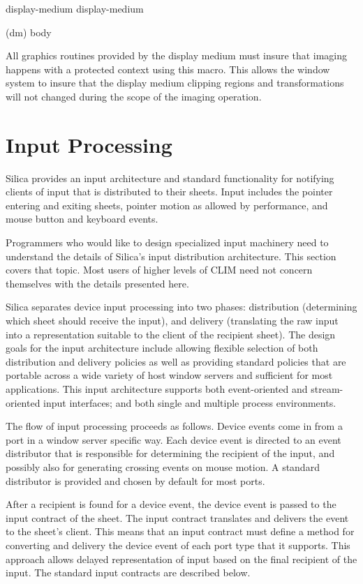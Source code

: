 { {display-medium} 
 {display-medium}

 {(dm) \body body}

All graphics routines provided by the display medium must insure that imaging
happens with a protected context using this macro.  This allows the window
system to insure that the display medium clipping regions and transformations
will not changed during the scope of the imaging operation.

\chapter {Input Processing}

Silica provides an input architecture and standard functionality for notifying
clients of input that is distributed to their sheets.  Input includes the
pointer entering and exiting sheets, pointer motion as allowed by performance,
and mouse button and keyboard events.

Programmers who would like to design specialized input machinery need to
understand the details of Silica's input distribution architecture.  This
section covers that topic.  Most users of higher levels of CLIM need not
concern themselves with the details presented here.

Silica separates device input processing into two phases:  distribution
(determining which sheet should receive the input), and delivery (translating
the raw input into a representation suitable to the client of the recipient
sheet).  The design goals for the input architecture include allowing flexible
selection of both distribution and delivery policies as well as providing
standard policies that are portable across a wide variety of host window servers
and sufficient for most applications.  This input architecture supports both
event-oriented and stream-oriented input interfaces; and both single and
multiple process environments.

The flow of input processing proceeds as follows.  Device events come in from a
port in a window server specific way.  Each device event is directed to an event
distributor that is responsible for determining the recipient of the input, and
possibly also for generating crossing events on mouse motion.  A standard
distributor is provided and chosen by default for most ports.

After a recipient is found for a device event, the device event is passed to the
input contract of the sheet.  The input contract translates and delivers the
event to the sheet's client.  This means that an input contract must define a
method for converting and delivery the device event of each port type that it
supports.  This approach allows delayed representation of input based on the
final recipient of the input.  The standard input contracts are described below.

}
